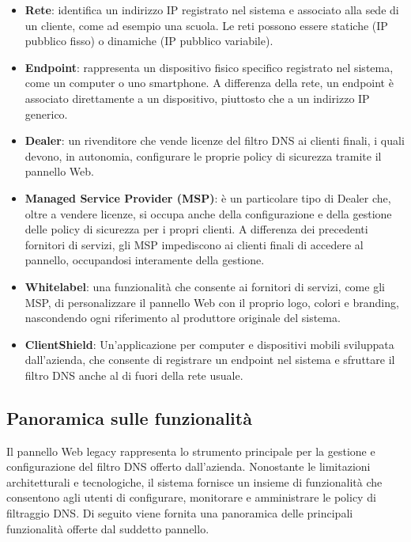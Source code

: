 \begin{itemize}
  \item \textbf{Rete}: identifica un indirizzo IP registrato nel sistema e associato alla sede di un cliente, come ad esempio una scuola. Le reti possono essere statiche (IP pubblico fisso) o dinamiche (IP pubblico variabile).

  \item \textbf{Endpoint}: rappresenta un dispositivo fisico specifico registrato nel sistema, come un computer o uno smartphone. A differenza della rete, un endpoint è associato direttamente a un dispositivo, piuttosto che a un indirizzo IP generico.

  \item \textbf{Dealer}: un rivenditore che vende licenze del filtro DNS ai clienti finali, i quali devono, in autonomia, configurare le proprie policy di sicurezza tramite il pannello Web.

  \item \textbf{Managed Service Provider (MSP)}: è un particolare tipo di Dealer che, oltre a vendere licenze, si occupa anche della configurazione e della gestione delle policy di sicurezza per i propri clienti. A differenza dei precedenti fornitori di servizi, gli MSP impediscono ai clienti finali di accedere al pannello, occupandosi interamente della gestione.

  \item \textbf{Whitelabel}: una funzionalità che consente ai fornitori di servizi, come gli MSP, di personalizzare il pannello Web con il proprio logo, colori e branding, nascondendo ogni riferimento al produttore originale del sistema.

  \item \textbf{ClientShield}: Un'applicazione per computer e dispositivi mobili sviluppata dall'azienda, che consente di registrare un endpoint nel sistema e sfruttare il filtro DNS anche al di fuori della rete usuale.
\end{itemize}

\subsection{Panoramica sulle funzionalità}
Il pannello Web legacy rappresenta lo strumento principale per la gestione e configurazione del filtro DNS offerto dall'azienda. Nonostante le limitazioni architetturali e tecnologiche, il sistema fornisce un insieme di funzionalità che consentono agli utenti di configurare, monitorare e amministrare le policy di filtraggio DNS. Di seguito viene fornita una panoramica delle principali funzionalità offerte dal suddetto pannello.

